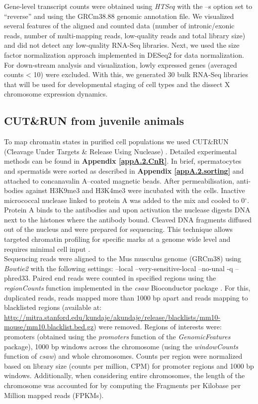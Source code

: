 Gene-level transcript counts were obtained using \emph{HTSeq} \citep{Anders2014} with the –s option set to “reverse” and using the GRCm38.88 genomic annotation file. We visualized several features of the aligned and counted data (number of intronic/exonic reads, number of multi-mapping reads, low-quality reads and total library size) and did not detect any low-quality RNA-Seq libraries. Next, we used the size factor normalization approach implemented in DESeq2 \citep{Love2014} for data normalization. For down-stream analysis and visualization, lowly expressed genes (averaged counts < 10) were excluded. With this, we generated 30 bulk RNA-Seq libraries that will be used for developmental staging of cell types and the dissect X chromosome expression dynamics.

\subsection{CUT\&{}RUN from juvenile animals}

To map chromatin states in purified cell populations we used CUT\&{}RUN (Cleavage Under Targets \& Release Using Nuclease) \citep{Skene2018}. Detailed experimental methods can be found in \textbf{Appendix \ref{appA.2.CnR}}. In brief, spermatocytes and spermatids were sorted as described in \textbf{Appendix \ref{appA.2.sorting}} and attached to concanavalin A–coated magnetic beads. After permeabilisation, anti-bodies against H3K9me3 and H3K4me3 were incubated with the cells. Inactive micrococcal nuclease linked to protein A was added to the mix and cooled to 0$^\circ$. Protein A binds to the antibodies and upon activation the nuclease digests DNA next to the histones where the antibody bound. Cleaved DNA fragments diffused out of the nucleus and were prepared for sequencing. This technique allows targeted chromatin profiling for specific marks at a genome wide level and requires minimal cell input \citep{Skene2018}.\\

Sequencing reads were aligned to the Mus musculus genome (GRCm38) using \textit{Bowtie2} with the following settings: --local --very-sensitive-local --no-unal -q --phred33. Paired end reads were counted in specified regions using the \textit{regionCounts} function implemented in the \textit{csaw} Bioconductor package \citep{Lun2015}. For this, duplicated reads, reads mapped more than 1000 bp apart and reads mapping to blacklisted regions (available at: \url{http://mitra.stanford.edu/kundaje/akundaje/release/blacklists/mm10-mouse/mm10.blacklist.bed.gz}) were removed. Regions of interests were: promoters (obtained using the \textit{promoters} function of the \textit{GenomicFeatures} package), 1000 bp windows across the chromosome (using the \textit{windowCounts} function of \textit{csaw}) and whole chromosomes. Counts per region were normalized based on library size (counts per million, CPM) for promoter regions and 1000 bp windows. Additionally, when considering entire chromosomes, the length of the chromosome was accounted for by computing the Fragments per Kilobase per Million mapped reads (FPKMs). 

